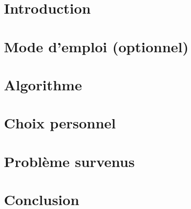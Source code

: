 \documentclass{article}
\begin{document}
\tableofcontents

\newpage

\section{Introduction}



\section{Mode d'emploi (optionnel)}



\section{Algorithme}





\section{Choix personnel}



\section{Problème survenus}



\section{Conclusion}


\end{document}
